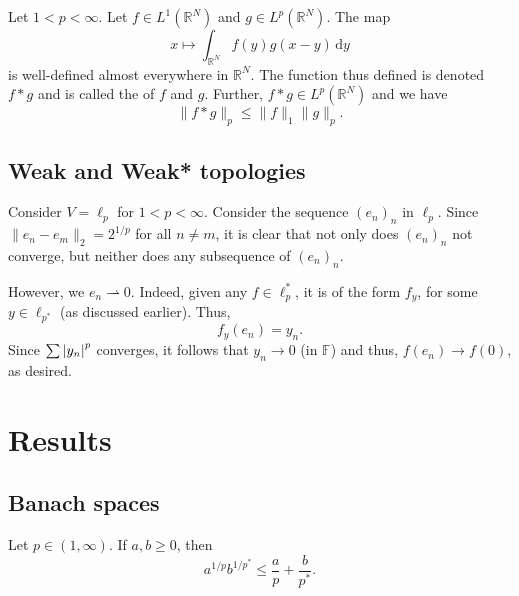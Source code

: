 \documentclass[12pt]{article}	%
\newcommand{\weak}{\rightharpoonup}
\begin{document}
\begin{thm}
	Let $1 < p < \infty$. Let $f \in L^{1}(\mathbb{R}^{N})$ and $g \in L^{p}(\mathbb{R}^{N})$. The map
	\begin{equation*} 
		x \mapsto \int_{\mathbb{R}^{N}}^{} f(y) g(x - y) \,{\mathrm{d}}y
	\end{equation*}
	is well-defined almost everywhere in $\mathbb{R}^{N}$. The function thus defined is denoted $f \ast g$ and is called the  of $f$ and $g$. Further, $f \ast g \in L^{p}(\mathbb{R}^{N})$ and we have
	\begin{equation*} 
		\|f \ast g\|_{p} \le \|f\|_{1} \|g\|_{p}.
	\end{equation*}
\end{thm}

\subsection{Weak and Weak* topologies}

\begin{ex}
	Consider $V = \ell_{p}$ for $1 < p < \infty$. Consider the sequence $(e_{n})_{n}$ in $\ell_{p}$. Since $\|e_{n} - e_{m}\|_{2} = 2^{1/p}$ for all $n \neq m$, it is clear that not only does $(e_{n})_{n}$ not converge, but neither does any subsequence of $(e_{n})_{n}$.

	However, we $e_{n} \weak 0$. Indeed, given any $f \in \ell_{p}^{\ast}$, it is of the form $f_{y}$, for some $y \in \ell_{p^{\ast}}$ (as discussed earlier). Thus,
	\begin{equation*} 
		f_{y}(e_{n}) = y_{n}.
	\end{equation*}
	Since $\sum {\left\lvert y_{n} \right\lvert}^{p}$ converges, it follows that $y_{n} \to 0$ (in $\mathbb{F}$) and thus, $f(e_{n}) \to f(0)$, as desired.
\end{ex}

\section{Results}

\subsection{Banach spaces}

\begin{prop}
	Let $p \in (1, \infty)$. If $a, b \ge 0$, then
	\begin{equation*} 
		a^{1/p} b^{1/p^{\ast}} \le \frac{a}{p} + \frac{b}{p^{\ast}}.
	\end{equation*}
\end{prop}
\end{document}
